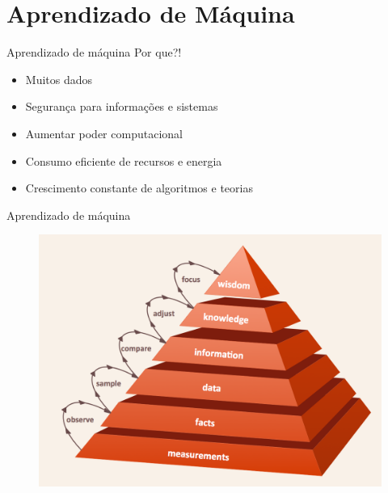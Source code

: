 \documentclass[t]{beamer}
\begin{document}
\section{Aprendizado de Máquina}


\begin{frame}{Aprendizado de máquina}
Por que?!
\begin{itemize}
	\item Muitos dados
	\item Segurança para informações e sistemas
	\item Aumentar poder computacional
	\item Consumo eficiente de recursos e energia
	\item Crescimento constante de algoritmos e teorias
\end{itemize}
\end{frame}

\begin{frame}{Aprendizado de máquina}
\begin{figure}
	\includegraphics[width=\linewidth]{PYRAMID-DIKW-hierarchy-3d-pyramid}
\end{figure}
\end{frame}
\end{document}
